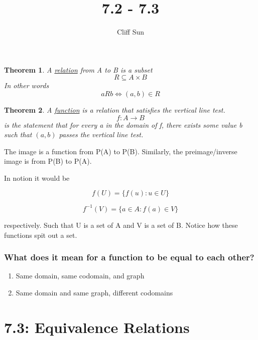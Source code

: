\documentclass{article}
\title{7.2 - 7.3}
\author{Cliff Sun}
\newtheorem{theorem}{Theorem}[section]
\begin{document}
\maketitle

\begin{theorem}
    A \underline{relation} from A to B is a subset 
    \begin{equation}
        R \subseteq A \times B
    \end{equation}
    In other words
    \begin{equation}
        a R b \iff (a,b) \in R
    \end{equation}
\end{theorem}

\begin{theorem}
    A \underline{function} is a relation that satisfies the vertical line test. 
    \begin{equation}
        f: A \rightarrow B
    \end{equation}
    is the statement that for every a in the domain of f, there exists some value b such that $(a,b)$ passes the vertical line test.
\end{theorem}

The image is a function from P(A) to P(B). Similarly, the preimage/inverse image is from P(B) to P(A).

In notion it would be 

\begin{equation}
    f(U) = \{f(u): u \in U\}
\end{equation}

\begin{equation}
    f^{-1}(V) = \{a \in A: f(a) \in V\}
\end{equation}

respectively. Such that U is a set of A and V is a set of B. Notice how these functions spit out a set. 

\subsubsection*{What does it mean for a function to be equal to each other?}

\begin{enumerate}
    \item Same domain, same codomain, and graph
    \item Same domain and same graph, different codomains
\end{enumerate}

\section*{7.3: Equivalence Relations}
\end{document}

